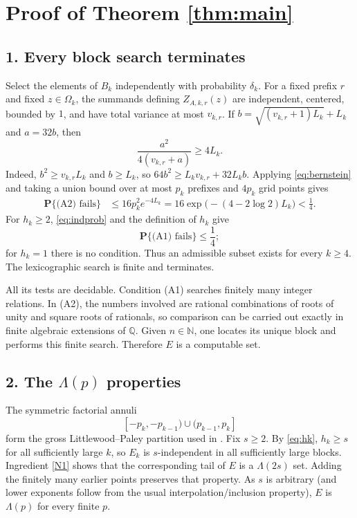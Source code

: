 \documentclass[11pt]{amsart}
\newcommand{\Pp}{\mathbf P}
\newcommand{\N}{\mathbb N}
\newcommand{\1}{\mathbf 1}
\theoremstyle{definition}
\theoremstyle{remark}
\begin{document}
\section*{Proof of Theorem \ref{thm:main}}

\subsection*{1. Every block search terminates}

Select the elements of $B_k$ independently with probability $\delta_k$.
For a fixed prefix $r$ and fixed $z\in\Omega_k$, the summands defining
$Z_{A,k,r}(z)$ are independent, centered, bounded by $1$, and have total
variance at most $v_{k,r}$.  If
$b=\sqrt{(v_{k,r}+1)L_k}+L_k$ and $a=32b$, then
\[
 \frac{a^2}{4(v_{k,r}+a)}\ge4L_k.
\]
Indeed, $b^2\ge v_{k,r}L_k$ and $b\ge L_k$, so
$64b^2\ge L_kv_{k,r}+32L_kb$.  Applying
\eqref{eq:bernstein} and taking a union bound over at most $p_k$ prefixes
and $4p_k$ grid points gives
\begin{align}
 \Pp\{\text{(A2) fails}\}
 &\le16p_k^2e^{-4L_k}
 =16\exp\bigl(-(4-2\log2)L_k\bigr)<\frac14.\label{eq:discprob}
\end{align}
For $h_k\ge2$, \eqref{eq:indprob} and the definition of $h_k$ give
\[
 \Pp\{\text{(A1) fails}\}\le\frac14;
\]
for $h_k=1$ there is no condition.  Thus an admissible subset exists for
every $k\ge4$.  The lexicographic search is finite and terminates.

All its tests are decidable.  Condition (A1) searches finitely many integer
relations.  In (A2), the numbers involved are rational combinations of
roots of unity and square roots of rationals, so comparison can be carried
out exactly in finite algebraic extensions of $\mathbb Q$.  Given
$n\in\N$, one locates its unique block and performs this finite search.
Therefore $E$ is a computable set.

\subsection*{2. The \texorpdfstring{$\Lambda(p)$}{Lambda(p)} properties}

The symmetric factorial annuli
\[
 [-p_k,-p_{k-1})\cup(p_{k-1},p_k]
\]
form the gross Littlewood--Paley partition used in \cite[\S5]{Neuwirth}.
Fix $s\ge2$.  By \eqref{eq:hk}, $h_k\ge s$ for all sufficiently large
$k$, so $E_k$ is $s$-independent in all sufficiently large blocks.
Ingredient \ref{N1} shows that the corresponding tail of $E$ is a
$\Lambda(2s)$ set.  Adding the finitely many earlier points preserves that
property.  As $s$ is arbitrary (and lower exponents follow from the usual
interpolation/inclusion property), $E$ is $\Lambda(p)$ for every finite
$p$.
\end{document}

